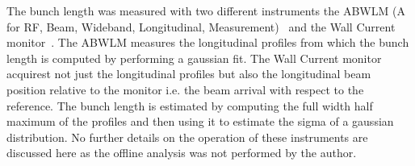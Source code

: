 \begin{sloppypar}
The bunch length was measured with two different instruments the ABWLM (A for RF, Beam, Wideband, Longitudinal, Measurement)~\cite{ABWLM} and the Wall Current monitor~\cite{Papotti:1124099}. The ABWLM measures the longitudinal profiles from which the bunch length is computed by performing a gaussian fit. The Wall Current monitor acquirest not just the longitudinal profiles but also the longitudinal beam position relative to the monitor i.e. the beam arrival with respect to the reference. The bunch length is estimated by computing the full width half maximum of the profiles and then using it to estimate the sigma of a gaussian distribution. No further details on the operation of these instruments are discussed here as the offline analysis was not performed by the author.
\end{sloppypar}



